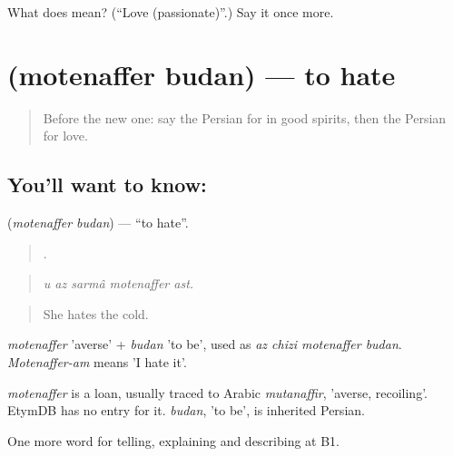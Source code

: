 \begin{tcolorbox}[breakable,colback=teal!4,colframe=teal!35!black,title={Before you move on}]
What does  mean? (\textquotedblleft{}Love (passionate)\textquotedblright{}.) Say it once more.
\end{tcolorbox}
\section[\texorpdfstring{\fa{متنفر} \fa{بودن} (motenaffer budan)}{متنفر بودن (motenaffer budan)}]{  (motenaffer budan) — to hate}

\label{lesson:FA-C486-motenaffer-budan}



\begin{quote}
Before the new one: say the Persian for in good spirits, then the Persian for love.
\end{quote}

\subsection*{You'll want to know:  }
\textbf{ } (\emph{motenaffer budan}) — \textquotedblleft{}to hate\textquotedblright{}.

\begin{quote}
    .
\end{quote}

\begin{quote}
\emph{u az sarmâ motenaffer ast.}
\end{quote}

\begin{quote}
She hates the cold.
\end{quote}

\emph{motenaffer} 'averse' + \emph{budan} 'to be', used as \emph{az chizi motenaffer budan}. \emph{Motenaffer-am} means 'I hate it'.

\begin{cousinweb}
\emph{motenaffer} is a loan, usually traced to Arabic \emph{mutanaffir}, 'averse, recoiling'. EtymDB has no entry for it. \emph{budan}, 'to be', is inherited Persian.
\end{cousinweb}

\begin{grammarlens}[title={What you've built}]
One more word for telling, explaining and describing at B1.
\end{grammarlens}

